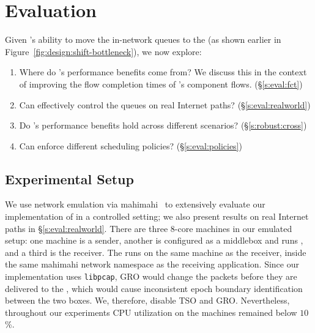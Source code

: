 \section{Evaluation}\label{s:eval}

Given \name's ability to move the in-network queues to the \inbox (as shown earlier in Figure~\ref{fig:design:shift-bottleneck}), we now explore:
\begin{enumerate}[leftmargin=15pt]
    \item Where do \name's performance benefits come from? We discuss this in the context of improving the flow completion times of \name's component flows. (\S\ref{s:eval:fct})
    \item Can \name effectively control the queues on real Internet paths? (\S\ref{s:eval:realworld})
    \item Do \name's performance benefits hold across different scenarios? (\S\ref{s:robust:cross})
    \item Can \name enforce different scheduling policies? (\S\ref{s:eval:policies})
\end{enumerate}

\subsection{Experimental Setup}\label{s:eval:setup}

We use network emulation via mahimahi~\cite{mahimahi} to extensively evaluate our implementation of \name in a controlled setting; we also present results on real Internet paths in \S\ref{s:eval:realworld}.
There are three $8$-core machines in our emulated setup: one machine is a sender, another is configured as a middlebox and runs \inbox, and a third is the receiver. The \outbox runs on the same machine as the receiver, inside the same mahimahi network namespace as the receiving application. 
Since our \outbox implementation uses \texttt{libpcap}, GRO would change the packets before they are delivered to the \outbox, which would cause inconsistent epoch boundary identification between the two boxes. We, therefore, disable TSO and GRO.
Nevertheless, throughout our experiments CPU utilization on the machines remained below $10$\%.

